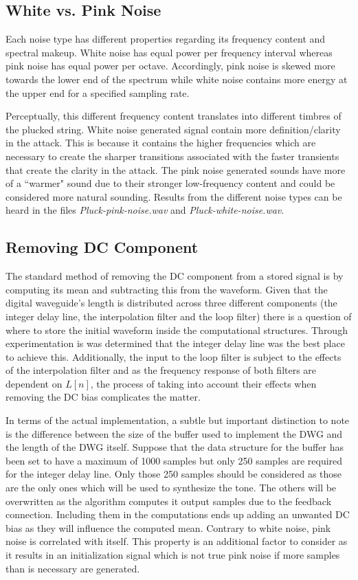 \documentclass[../main.tex]{subfiles}
\begin{document}
\subsection{White vs. Pink Noise}
Each noise type has different properties regarding its frequency content and spectral makeup. White noise has equal power per frequency interval whereas pink noise has equal power per octave. Accordingly, pink noise is skewed more towards the lower end of the spectrum while white noise contains more energy at the upper end for a specified sampling rate. 

Perceptually, this different frequency content translates into different timbres of the plucked string. White noise generated signal contain more definition/clarity in the attack. This is because it contains the higher frequencies which are necessary to create the sharper transitions associated with the faster transients that create the clarity in the attack. The pink noise generated sounds have more of a ``warmer" sound due to their stronger low-frequency content and could be considered more natural sounding. Results from the different noise types can be heard in the files \emph{Pluck-pink-noise.wav} and \emph{Pluck-white-noise.wav}.

\subsection{Removing DC Component}
The standard method of removing the DC component from a stored signal is by computing its mean and subtracting this from the waveform. Given that the digital waveguide's length is distributed across three different components (the integer delay line, the interpolation filter and the loop filter) there is a question of where to store the initial waveform inside the computational structures. Through experimentation is was determined that the integer delay line was the best place to achieve this. Additionally, the input to the loop filter is subject to the effects of the interpolation filter and as the frequency response of both filters are dependent on $L[n]$, the process of taking into account their effects when removing the DC bias complicates the matter.

In terms of the actual implementation, a subtle but important distinction to note is the difference between the size of the buffer used to implement the DWG and the length of the DWG itself. Suppose that the data structure for the buffer has been set to have a maximum of 1000 samples but only 250 samples are required for the integer delay line. Only those 250 samples should be considered as those are the only ones which will be used to synthesize the tone. The others will be overwritten as the algorithm computes it output samples due to the feedback connection. Including them in the computations ends up adding an unwanted DC bias as they will influence the computed mean. Contrary to white noise, pink noise is correlated with itself. This property is an additional factor to consider as it results in an initialization signal which is not true pink noise if more samples than is necessary are generated.
\end{document}
